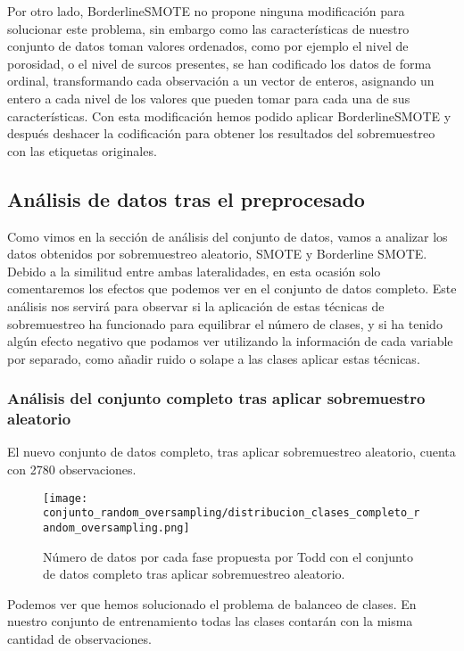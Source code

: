 Por otro lado, BorderlineSMOTE no propone ninguna modificación para solucionar este problema, sin embargo como las características de nuestro conjunto de datos toman valores ordenados, como por ejemplo el nivel de porosidad, o el nivel de surcos presentes, se han codificado los datos de forma ordinal, transformando cada observación a un vector de enteros, asignando un entero a cada nivel de los valores que pueden tomar para cada una de sus características. Con esta modificación hemos podido aplicar BorderlineSMOTE y después deshacer la codificación para obtener los resultados del sobremuestreo con las etiquetas originales.

\subsection{Análisis de datos tras el preprocesado}

Como vimos en la sección de análisis del conjunto de datos, vamos a analizar los datos obtenidos por sobremuestreo aleatorio, SMOTE y Borderline SMOTE. Debido a la similitud entre ambas lateralidades, en esta ocasión solo comentaremos los efectos que podemos ver en el conjunto de datos completo. Este análisis nos servirá para observar si la aplicación de estas técnicas de sobremuestreo ha funcionado para equilibrar el número de clases, y si ha tenido algún efecto negativo que podamos ver utilizando la información de cada variable por separado, como añadir ruido o solape a las clases aplicar estas técnicas.

\subsubsection{Análisis del conjunto completo tras aplicar sobremuestro aleatorio}

El nuevo conjunto de datos completo, tras aplicar sobremuestreo aleatorio, cuenta con 2780 observaciones.

\begin{figure}[H]
	\centering
	\texttt{[image: conjunto\_random\_oversampling/distribucion\_clases\_completo\_random\_oversampling.png]}
	\caption{Número de datos por cada fase propuesta por Todd con el conjunto de datos completo tras aplicar sobremuestreo aleatorio.}
	\label{fig:conteo_c}
\end{figure}


Podemos ver que hemos solucionado el problema de balanceo de clases. En nuestro conjunto de entrenamiento todas las clases contarán con la misma cantidad de observaciones.

